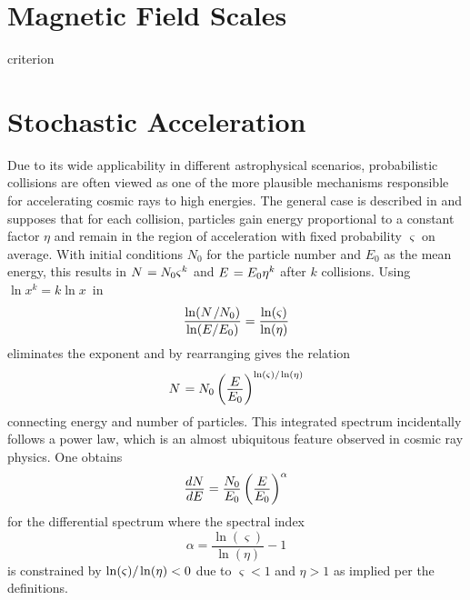 \section{Magnetic Field Scales}
\label{sec:fields}

\newpage

\cite{Hillas_1984} criterion



\section{Stochastic Acceleration}
\label{sec:stochastic}

Due to its wide applicability in different astrophysical scenarios, probabilistic collisions are often viewed as one of
the more plausible mechanisms responsible for accelerating cosmic rays to high energies. The general case is described in
\cite{Longair_2011} and supposes that for each collision, particles gain energy proportional to a constant factor $\eta$ and
remain in the region of acceleration with fixed probability $\varsigma$ on average. With initial conditions $N_0$ for the
particle number and $E_0$ as the mean energy, this results in $N \kern+0.9pt = N_0 \varsigma^k$ and $E \kern+0.9pt = E_0 \eta^k$
after $k$ collisions. Using $\ln x^k = k\ln x$~in
\begin{equation*}
	\frac{\ln (N \kern+1.0pt / N_0)}{\ln (E / E_0)} = \frac{\ln(\varsigma)}{\ln(\eta)}
\end{equation*}
eliminates the exponent and by rearranging gives the relation
\begin{equation*}
	N \kern+0.9pt = N_0 \left( \frac{\raisebox{-0.3ex}{$E$}}{\raisebox{0.3ex}{$E_0$}} \right)^{\ln(\varsigma) / \kern-0.5pt \ln(\eta)}
\end{equation*}
connecting energy and number of particles. This integrated spectrum incidentally follows a power law, which is an almost
ubiquitous feature observed in cosmic ray physics. One obtains
\begin{equation*}
	\frac{\raisebox{-0.3ex}{$dN$}}{\raisebox{0.3ex}{$dE$}} = \frac{\raisebox{-0.3ex}{$N_0$}}{\raisebox{0.3ex}{$E_0$}}
	\left( \frac{\raisebox{-0.3ex}{$E$}}{\raisebox{0.3ex}{$E_0$}} \right)^\alpha
\end{equation*}
for the differential spectrum where the spectral index
\begin{equation*}
	\alpha = \frac{\ln(\varsigma)}{\ln(\eta)} - 1
\end{equation*}
is constrained by $\ln(\varsigma) / \kern-0.5pt \ln(\eta) < 0$ due to $\varsigma < 1$ and $\eta > 1$ as implied per the definitions.

